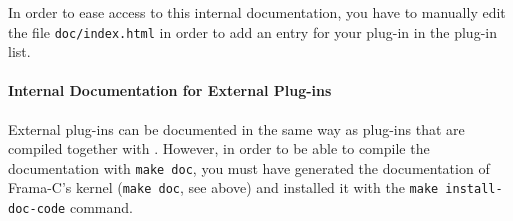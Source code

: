 In order to ease access to this internal documentation, you have to
manually edit the file \texttt{doc/index.html} in order to add
an entry for your plug-in in the plug-in list.

\paragraph{Internal Documentation for External Plug-ins}

External plug-ins can be documented in the same way as plug-ins that are 
compiled together with \framac. However, in order to be able to compile the
documentation with \texttt{make doc}, you must have generated the documentation
of Frama-C's kernel (\texttt{make doc}, see above) and installed it with the 
\texttt{make install-doc-code} command.





